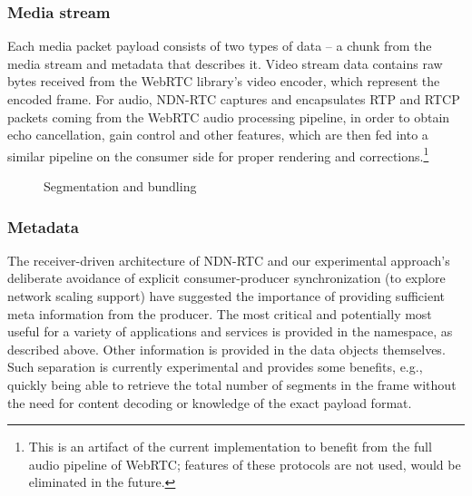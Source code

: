 \documentclass{icn/sig-alternate-2013} %
\newcommand{\ndnrtcName}{NDN-RTC} %
\begin{document}
\subsubsection{Media stream}
Each media packet payload consists of two types of data -- a chunk from the media stream and metadata that describes it. Video stream data contains raw bytes received from the WebRTC library's video encoder, which represent the encoded frame. For audio, \ndnrtcName{} captures and encapsulates RTP and RTCP packets coming from the WebRTC audio processing pipeline, in order to obtain echo cancellation, gain control and other features, which are then fed into a similar pipeline on the consumer side for proper rendering and corrections.\footnote{This is an artifact of the current implementation to benefit from the full audio pipeline of WebRTC; features of these protocols are not used, would be eliminated in the future.}

\begin{figure}[t!]
\centering
{}
\caption{Segmentation and bundling}
\end{figure}

\subsubsection{Metadata}

The receiver-driven architecture of \ndnrtcName{} and our experimental approach's deliberate avoidance of explicit consumer-producer synchronization (to explore network scaling support) have suggested the importance of providing sufficient meta information from the producer. The most critical and potentially most useful for a variety of applications and services is provided in the namespace, as described above.  Other information is provided in the data objects themselves. Such separation is currently experimental and provides some benefits, e.g., quickly being able to retrieve the total number of segments in the frame without the need for content decoding or knowledge of the exact payload format.
%
\end{document}
